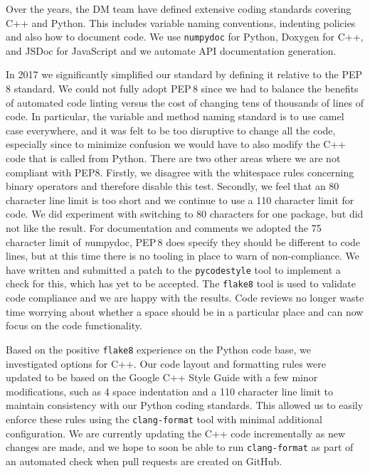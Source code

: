 Over the years, the DM team have defined extensive coding standards\cite{devguide} covering C++ and Python.
This includes variable naming conventions, indenting policies and also how to document code.
We use \texttt{numpydoc}\cite{numpydoc} for Python, Doxygen\cite{doxygen} for C++, and JSDoc\cite{jsdoc} for JavaScript and we automate API documentation generation.

In 2017 we significantly simplified our standard by defining it relative to the PEP\,8 standard\cite{pep8}.
We could not fully adopt PEP\,8 since we had to balance the benefits of automated code linting versus the cost of changing tens of thousands of lines of code.
In particular, the variable and method naming standard is to use camel case everywhere, and it was felt to be too disruptive to change all the code, especially since to minimize confusion we would have to also modify the C++ code that is called from Python.
There are two other areas where we are not compliant with PEP8.
Firstly, we disagree with the whitespace rules concerning binary operators and therefore disable this test.
Secondly, we feel that an 80 character line limit is too short and we continue to use a 110 character limit for code.
We did experiment with switching to 80 characters for one package, but did not like the result.
For documentation and comments we  adopted the 75  character limit of {\emph numpydoc}, PEP\,8 does specify they should be different to code lines, but at this time there is no tooling in place to warn of non-compliance.
We have written and submitted a patch to the \texttt{pycodestyle} tool to implement a check for this, which has yet to be  accepted.
The \texttt{flake8} tool is used to validate code compliance and we are happy with the results.
Code reviews no longer waste time worrying about whether a space should be in a particular place and can now focus on the code functionality.

Based on the positive  \texttt{flake8} experience on the Python code base, we investigated options for C++.
Our code layout and formatting rules were updated to be based on the Google C++ Style Guide\cite{googlestyle} with a few minor modifications, such as 4 space indentation and a 110 character line limit to maintain consistency with our Python coding standards.
This allowed us to easily enforce these rules using the \texttt{clang-format}\cite{clangformat} tool with minimal additional configuration.
We are currently updating the C++ code incrementally as new changes are made, and we hope to soon be able to run \texttt{clang-format} as part of an automated check when pull requests are created on GitHub.

